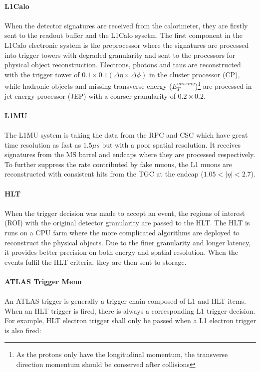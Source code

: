 \noindent
\\{\bf L1Calo}
\\
\\When the detector signatures are received from the calorimeter, they are firstly sent to the readout buffer and the L1Calo sysetm. The first component in the L1Calo electronic system is the preprocessor where the signatures are processed into trigger towers with degraded granularity and sent to the processors for physical object reconstruction. Electrons, photons and taus are reconstructed with the trigger tower of $0.1 \times 0.1 (\Delta \eta \times \Delta \phi)$ in the cluster processor (CP), while hadronic objects and missing transverse energy ($E_{T}^{missing}$)\footnote{As the protons only have the longitudinal momentum, the transverse direction momentum should be conserved after collisions} are processed in jet energy processor (JEP) with a coarser granularity of $0.2\times 0.2$.
\\
\\{\bf L1MU}
\\
\\The L1MU system is taking the data from the RPC and CSC which have great time resolution as fast as $1.5\mu s$ but with a poor spatial resolution. It receives signatures from the MS barrel and endcaps where they are processed respectively. To further suppress the rate contributed by fake muons, the L1 muons are reconstructed with consistent hits from the TGC at the endcap ($1.05<|\eta|<2.7$). 
\\
\\{\bf HLT}
\\
\\When the trigger decision was made to accept an event, the regions of interest (ROI) with the original detector granularity are passed to the HLT. The HLT is runs on a CPU farm where the more complicated algorithms are deployed to reconstruct the physical objects. Due to the finer granularity and longer latency, it provides better precision on both energy and spatial resolution. When the events fulfil the HLT criteria, they are then sent to storage. 
\\
\\{\bf ATLAS Trigger Menu}
\\
\\An ATLAS trigger is generally a trigger chain composed of L1 and HLT items. When an HLT trigger is fired, there is always a corresponding L1 trigger decision. For example, HLT electron trigger shall only be passed when a L1 electron trigger is also fired:
